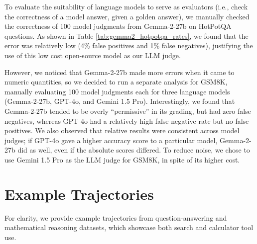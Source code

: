 \documentclass{article} %
\begin{document}
To evaluate the suitability of language models to serve as evaluators (i.e., check the correctness of a model answer, given a golden answer), we manually checked the correctness of 100 model judgments from Gemma-2-27b on HotPotQA questions. As shown in Table \ref{tab:gemma2_hotpotqa_rates}, we found that the error was relatively low (4\% false positives and 1\% false negatives), justifying the use of this low cost open-source model as our LLM judge. 

However, we noticed that Gemma-2-27b made more errors when it came to numeric quantities, so we decided to run a separate analysis for GSM8K, manually evaluating 100 model judgments each for three language models (Gemma-2-27b, GPT-4o, and Gemini 1.5 Pro). Interestingly, we found that Gemma-2-27b tended to be overly ``permissive'' in its grading, but had zero false negatives, whereas GPT-4o had a relatively high false negative rate but no false positives. We also observed that relative results were consistent across model judges; if GPT-4o gave a higher accuracy score to a particular model, Gemma-2-27b did as well, even if the absolute scores differed. To reduce noise, we chose to use Gemini 1.5 Pro as the LLM judge for GSM8K, in spite of its higher cost.

\newpage\section{Example Trajectories}
\label{sec:example-trajectories}

For clarity, we provide example trajectories from question-answering and mathematical reasoning datasets, which showcase both search and calculator tool use.
\end{document}
